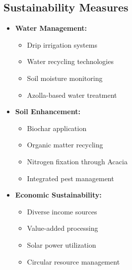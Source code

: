 \subsection{Sustainability Measures}
\begin{itemize}
    \item \textbf{Water Management:}
    \begin{itemize}
        \item Drip irrigation systems
        \item Water recycling technologies
        \item Soil moisture monitoring
        \item Azolla-based water treatment
    \end{itemize}
    
    \item \textbf{Soil Enhancement:}
    \begin{itemize}
        \item Biochar application
        \item Organic matter recycling
        \item Nitrogen fixation through Acacia
        \item Integrated pest management
    \end{itemize}
    
    \item \textbf{Economic Sustainability:}
    \begin{itemize}
        \item Diverse income sources
        \item Value-added processing
        \item Solar power utilization
        \item Circular resource management
    \end{itemize}
\end{itemize}
